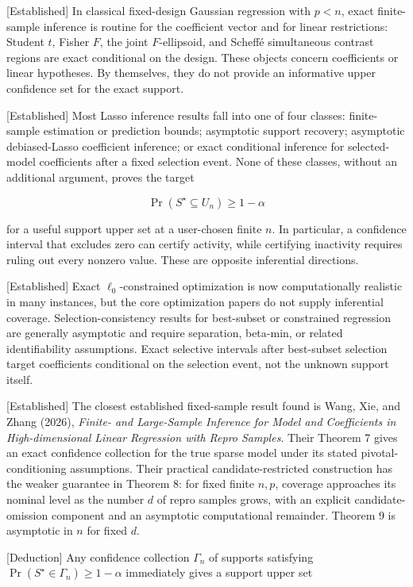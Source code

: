 \documentclass[
  english,
  11pt,
  a4paper,
]{article}
\begin{document}
{[}Established{]} In classical fixed-design Gaussian regression with
$p<n$, exact finite-sample inference is routine for the coefficient
vector and for linear restrictions: Student $t$, Fisher $F$, the
joint $F$-ellipsoid, and Scheffé simultaneous contrast regions are
exact conditional on the design. These objects concern coefficients or
linear hypotheses. By themselves, they do not provide an informative
upper confidence set for the exact support.

{[}Established{]} Most Lasso inference results fall into one of four
classes: finite-sample estimation or prediction bounds; asymptotic
support recovery; asymptotic debiased-Lasso coefficient inference; or
exact conditional inference for selected-model coefficients after a
fixed selection event. None of these classes, without an additional
argument, proves the target

$$
\Pr\!\left(S^\star\subseteq U_n\right)\ge 1-\alpha
$$

for a useful support upper set at a user-chosen finite $n$. In
particular, a confidence interval that excludes zero can certify
activity, while certifying inactivity requires ruling out every nonzero
value. These are opposite inferential directions.

{[}Established{]} Exact $\ell_0$-constrained optimization is now
computationally realistic in many instances, but the core optimization
papers do not supply inferential coverage. Selection-consistency results
for best-subset or constrained regression are generally asymptotic and
require separation, beta-min, or related identifiability assumptions.
Exact selective intervals after best-subset selection target
coefficients conditional on the selection event, not the unknown support
itself.

{[}Established{]} The closest established fixed-sample result found is
Wang, Xie, and Zhang (2026), \emph{Finite- and Large-Sample Inference
for Model and Coefficients in High-dimensional Linear Regression with
Repro Samples}. Their Theorem 7 gives an exact confidence collection for
the true sparse model under its stated pivotal-conditioning assumptions.
Their practical candidate-restricted construction has the weaker
guarantee in Theorem 8: for fixed finite $n,p$, coverage approaches
its nominal level as the number $d$ of repro samples grows, with an
explicit candidate-omission component and an asymptotic computational
remainder. Theorem 9 is asymptotic in $n$ for fixed $d$.

{[}Deduction{]} Any confidence collection $\Gamma_n$ of supports
satisfying $\Pr(S^\star\in\Gamma_n)\ge1-\alpha$ immediately gives a
support upper set
\end{document}
